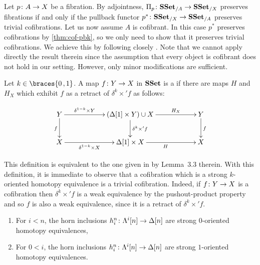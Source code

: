 \documentclass[reqno,10pt,a4paper,oneside,draft]{amsart}
\begin{document}
Let $p \colon A \rightarrow X$ be a fibration. By adjointness, $\Pi_p \colon \mathbf{SSet}_{/A} \to \mathbf{SSet}_{/X}$  preserves fibrations if and only if the pullback functor $p^* \colon \mathbf{SSet}_{/X} \to \mathbf{SSet}_{/A}$ preserves trivial cofibrations. Let us now assume  $A$ is cofibrant. 
In this case $p^*$ preserves cofibrations by \cref{thm:cof-pbk}, so we only need to show that it preserves
trivial cofibrations. We achieve this by following closely \cite[Section~3]{gambino2017frobenius}. Note that we cannot apply directly the result therein since 
the assumption that every object is cofibrant does not hold in our setting. However, only minor modifications are sufficient.




\begin{definition} \label{def:strhtpyequiv} Let $k \in \braces{0 \, , 1 }$.
A map $f \colon Y \rightarrow X$ in $\mathbf{SSet}$ is a  if there are maps $H$ and $H_X$ which exhibit $f$ as a retract of $\delta^k \times ' f$ as follows:

\[
\xymatrix@C=2cm{
Y \ar[d]_{f} \ar[r]^-{\delta^{1-k} \times Y} & 
( \Delta[1] \times Y ) \cup X \ar[d]^{\delta^k \times' f} \ar[r]^-{H_X} & 
Y \ar[d]^{f} \\
X \ar[r]_-{\delta^{1-k} \times X}  & 
\Delta[1] \times X \ar[r]_{H} &
X  }
\]
\end{definition}

This definition is equivalent to the one given in \cite{gambino2017frobenius} by Lemma~3.3 therein.
With this definition, it is immediate to observe that a cofibration which is a strong $k$-oriented homotopy equivalence is a trivial cofibration. Indeed, if $f \colon Y \to X$ is a cofibration then $\delta^k \times ' f$ is 
a weak equivalence by the pushout-product property and so $f$ is also a weak equivalence, since it is a retract of $\delta^k \times ' f$.

\begin{lemma}\label{lemma:genTcof_strongHequiv} \hfill 
\begin{enumerate}[$(i)$]
\item For $i < n$, the horn inclusions $h^n_i \colon \Lambda^i[n] \rightarrow \Delta[n]$ are strong $0$-oriented homotopy equivalences,
\item For $0 < i $, the horn inclusions $h^n_i \colon \Lambda^i[n] \rightarrow \Delta[n]$ are strong $1$-oriented homotopy equivalences.
\end{enumerate}
\end{lemma}
\end{document}
